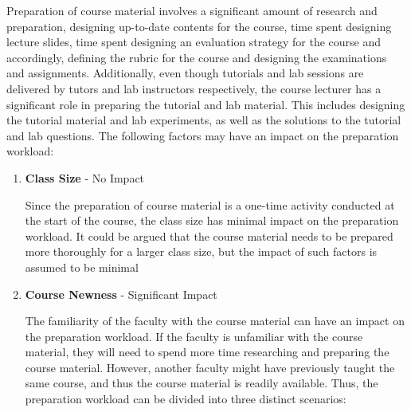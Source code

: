 Preparation of course material involves a significant amount of research and preparation, designing up-to-date contents for the course, time spent designing lecture slides, time spent designing an evaluation strategy for the course and accordingly, defining the rubric for the course and designing the examinations and assignments. Additionally, even though tutorials and lab sessions are delivered by tutors and lab instructors respectively, the course lecturer has a significant role in preparing the tutorial and lab material. This includes designing the tutorial material and lab experiments, as well as the solutions to the tutorial and lab questions. The following factors may have an impact on the preparation workload:

\begin{enumerate}
  \item \textbf{Class Size} - No Impact

        Since the preparation of course material is a one-time activity conducted at the start of the course, the class size has minimal impact on the preparation workload. It could be argued that the course material needs to be prepared more thoroughly for a larger class size, but the impact of such factors is assumed to be minimal

  \item \textbf{Course Newness} - Significant Impact

        The familiarity of the faculty with the course material can have an impact on the preparation workload. If the faculty is unfamiliar with the course material, they will need to spend more time researching and preparing the course material. However, another faculty might have previously taught the same course, and thus the course material is readily available. Thus, the preparation workload can be divided into three distinct scenarios:


\end{enumerate}
